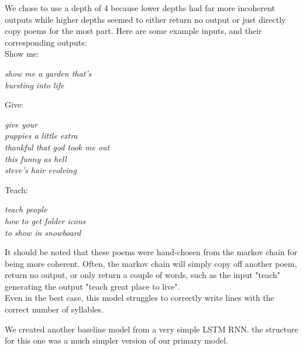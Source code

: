 \documentclass{article} %
\begin{document}
We chose to use a depth of 4 because lower depths had far more incoherent outputs while higher depths seemed to either return no output
or just directly copy poems for the most part. Here are some example inputs, and their corresponding outputs:\\


Show me:
\begin{flushleft}
  \textit{
      \hspace{2em} show me a garden that's \\
      \hspace{2em} bursting into life
  }
\end{flushleft}

Give:
\begin{flushleft}
  \textit{
      \hspace{2em} give your \\
      \hspace{2em} puppies a little extra\\
      \hspace{2em} thankful that god took me out\\
      \hspace{2em} this funny as hell\\
      \hspace{2em} steve's hair evolving\\
  }
\end{flushleft}


 Teach:
 \begin{flushleft}
  \textit{
      \hspace{2em} teach people  \\
      \hspace{2em} how to get folder icons\\
      \hspace{2em} to show in snowboard\\
  }
\end{flushleft}

It should be noted that these poems were hand-chosen from the markov chain for being more coherent. Often, the markov chain will simply copy
off another poem, return no output, or only return a couple of words, such as the input "teach" generating the output "teach great place to live".\\

Even in the best case, this model struggles to correctly write lines with the correct number of syllables.

We created another baseline model from a very simple LSTM RNN. the structure for this one was a much simpler version of our primary model.\\
\end{document}
